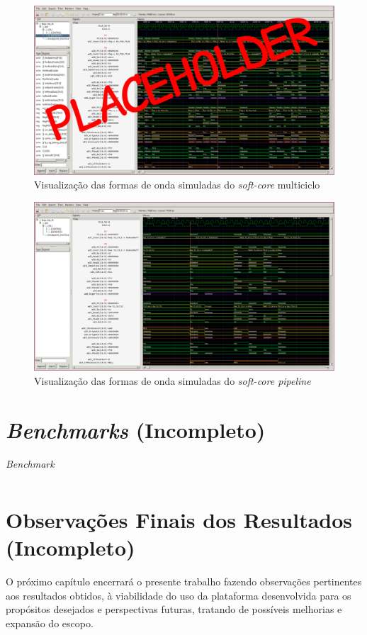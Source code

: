     \begin{figure}[H]
    \centering
        \includegraphics[width=0.9\linewidth]{../images/gtkwave/gtkwave_multi.png}
        \caption{Visualização das formas de onda simuladas do \textit{soft-core} multiciclo}
        \label{fig:gtkwave_multi}
    \end{figure}

    \begin{figure}[H]
    \centering
        \includegraphics[width=0.9\linewidth]{../images/gtkwave/gtkwave_pipe.png}
        \caption{Visualização das formas de onda simuladas do \textit{soft-core pipeline}}
        \label{fig:gtkwave_pipe}
    \end{figure}

\section{\textit{Benchmarks} (Incompleto)}
    {
    }
    \begin{longtable}{|l|}
        \caption{\textit{Benchmark}}\label{table:benchmark}\\
        \hline
        \hline
        \endfirsthead
        \hline
        \hline
        \endhead
        \hline
    \end{longtable}

\section{Observações Finais dos Resultados (Incompleto)}

    { O próximo capítulo encerrará o presente trabalho fazendo observações
        pertinentes aos resultados obtidos, à viabilidade do uso da plataforma
        desenvolvida para os propósitos desejados e perspectivas futuras,
        tratando de possíveis melhorias e expansão do escopo.
    }

